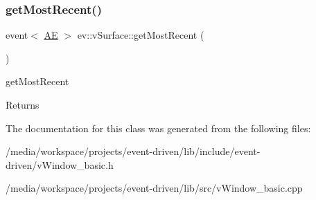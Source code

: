 \subsubsection{\texorpdfstring{get\+Most\+Recent()}{getMostRecent()}}
{\footnotesize\ttfamily event$<$ \hyperlink{classev_1_1AddressEvent}{AE} $>$ ev\+::v\+Surface\+::get\+Most\+Recent (\begin{DoxyParamCaption}{ }\end{DoxyParamCaption})}



get\+Most\+Recent 

\begin{DoxyReturn}{Returns}

\end{DoxyReturn}


The documentation for this class was generated from the following files\+:\begin{DoxyCompactItemize}
\item 
/media/workspace/projects/event-\/driven/lib/include/event-\/driven/v\+Window\+\_\+basic.\+h\item 
/media/workspace/projects/event-\/driven/lib/src/v\+Window\+\_\+basic.\+cpp\end{DoxyCompactItemize}
